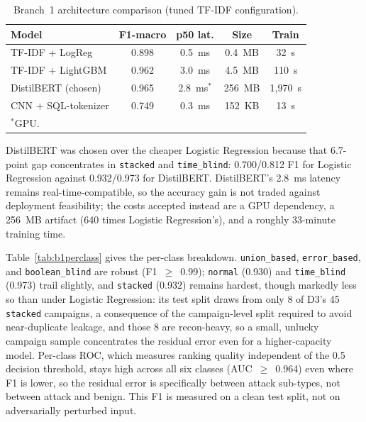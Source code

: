 \documentclass[conference]{IEEEtran}
\begin{document}
\begin{table}[t]
\caption{Branch~1 architecture comparison (tuned TF-IDF configuration).}
\label{tab:b1arch}
\begin{center}
\begin{tabular}{@{}lcccc@{}}
\toprule
\textbf{Model} & \textbf{F1-macro} & \textbf{p50 lat.} & \textbf{Size} & \textbf{Train} \\
\midrule
TF-IDF + LogReg & 0.898 & 0.5~ms & 0.4~MB & 32~s \\
TF-IDF + LightGBM & 0.962 & 3.0~ms & 4.5~MB & 110~s \\
DistilBERT (chosen) & 0.965 & 2.8~ms$^{\ast}$ & 256~MB & 1{,}970~s \\
CNN + SQL-tokenizer & 0.749 & 0.3~ms & 152~KB & 13~s \\
\bottomrule
\multicolumn{5}{l}{\footnotesize $^{\ast}$GPU.}
\end{tabular}
\end{center}
\end{table}

DistilBERT was chosen over the cheaper Logistic Regression because that 6.7-point gap concentrates in \texttt{stacked} and \texttt{time\_blind}: 0.700/0.812 F1 for Logistic Regression against 0.932/0.973 for DistilBERT. DistilBERT's 2.8~ms latency remains real-time-compatible, so the accuracy gain is not traded against deployment feasibility; the costs accepted instead are a GPU dependency, a 256~MB artifact (640 times Logistic Regression's), and a roughly 33-minute training time.

Table~\ref{tab:b1perclass} gives the per-class breakdown. \texttt{union\_based}, \texttt{error\_based}, and \texttt{boolean\_blind} are robust (F1~$\geq$~0.99); \texttt{normal} (0.930) and \texttt{time\_blind} (0.973) trail slightly, and \texttt{stacked} (0.932) remains hardest, though markedly less so than under Logistic Regression: its test split draws from only 8 of D3's 45 \texttt{stacked} campaigns, a consequence of the campaign-level split required to avoid near-duplicate leakage, and those 8 are recon-heavy, so a small, unlucky campaign sample concentrates the residual error even for a higher-capacity model. Per-class ROC, which measures ranking quality independent of the 0.5 decision threshold, stays high across all six classes (AUC~$\geq$~0.964) even where F1 is lower, so the residual error is specifically between attack sub-types, not between attack and benign. This F1 is measured on a clean test split, not on adversarially perturbed input.
\end{document}

